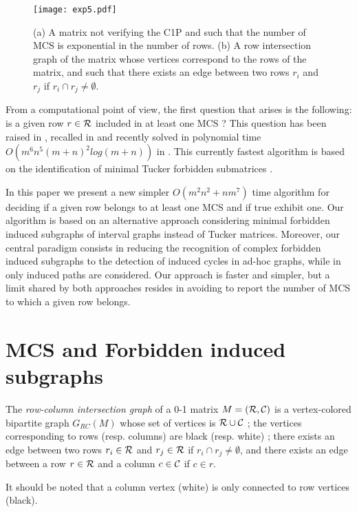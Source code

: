 \documentclass{article}
\begin{document}
\begin{figure}[htb]
  \centering
\texttt{[image: exp5.pdf]}
\caption{(a) A matrix not verifying the C1P and such that the number 
of MCS is exponential in the  number of rows. (b) A row intersection
graph of the matrix whose vertices correspond to the rows of the matrix,
and such that there exists an edge between two rows $r_i$ and $r_j$ 
if $r_i\cap r_j \neq \emptyset$.}
 \label{MCS-exp2}
\end{figure}


From a computational point of view, the first question that arises is the
following: is a given row $r\in {\cal R}$ included in at least one MCS ? 
This question has been raised in \cite{BBCC2004}, recalled in 
\cite{CHSY2009,Chauve08} and recently solved in polynomial time
$O(m^6n^5(m+n)^2log(m+n))$ in \cite{Blin2011}. This currently fastest 
algorithm is based on the identification of minimal Tucker forbidden 
submatrices \cite{T1972,D2009}.

In this paper we present a new simpler $O(m^2n^2 + nm^7)$ time
algorithm for deciding if a given row belongs to at least one MCS and
if true exhibit one. Our algorithm is based on an
alternative approach considering minimal forbidden induced subgraphs
of interval graphs \cite{LB62} instead of Tucker matrices. Moreover,
our central paradigm consists in reducing the recognition of complex
forbidden induced subgraphs to the detection of induced cycles in
ad-hoc graphs, while in \cite{Blin2011} only induced paths are
considered. Our approach is faster and simpler, but a limit
shared by both approaches 
resides in  avoiding to report the number of MCS to which a given row belongs.


\section{MCS and Forbidden induced subgraphs}



The \emph{row-column intersection graph} of a 0-1 matrix 
$M=({\cal R}, {\cal C})$ is a vertex-colored 
bipartite graph $G_{RC}(M)$ whose set of vertices is ${\cal R}\cup {\cal C}$ ;  
the vertices corresponding to rows (resp. columns) are black (resp. white) ;
there exists an edge between two rows $r_i\in {\cal R}$ and $r_j\in {\cal R}$ 
if $r_i\cap r_j \neq \emptyset$, and there exists an edge between a row 
$r\in {\cal R}$ and a column $c\in {\cal C}$ if $c\in r$. 

It should be noted that a column vertex (white) is only connected to row vertices (black).
\end{document}
